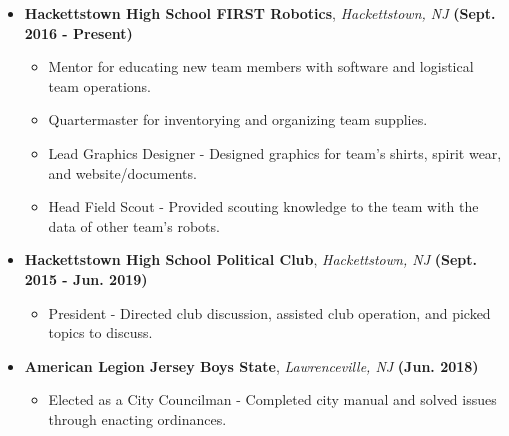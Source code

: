 \documentclass[11pt]{article}
\begin{document}
\begin{flushleft}
\begin{itemize}
\begin{itemize}
\begin{itemize}
                \end{itemize}
            \item \textbf{Hackettstown High School FIRST Robotics}, \textit{Hackettstown, NJ} \hfill{\textbf{(Sept. 2016 - Present)}}
                \begin{itemize}
                    \item Mentor for educating new team members with software and logistical team operations.
                    \item Quartermaster for inventorying and organizing team supplies.
                    \item Lead Graphics Designer - Designed graphics for team's shirts, spirit wear, and website/documents.
                    \item Head Field Scout - Provided scouting knowledge to the team with the data of other team's robots.
                \end{itemize}
            \item \textbf{Hackettstown High School Political Club}, \textit{Hackettstown, NJ} \hfill{\textbf{(Sept. 2015 - Jun. 2019)}}
                    \begin{itemize}
                        \item President - Directed club discussion, assisted club operation, and picked topics to discuss.
                    \end{itemize}
                \item \textbf{American Legion Jersey Boys State}, \textit{Lawrenceville, NJ} \hfill{\textbf{(Jun. 2018)}}
                    \begin{itemize}
                        \item Elected as a City Councilman - Completed city manual and solved issues through enacting ordinances.
                    \end{itemize}
            \end{itemize}
\end{itemize}

\end{flushleft}
\end{document}

